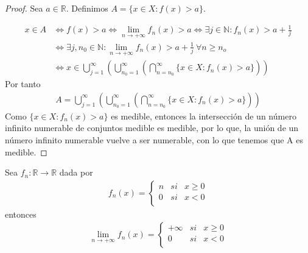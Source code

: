\begin{proof}
    Sea $a \in \mathbb{R}$. Definimos $A = \{ x \in X : f(x) > a\}$.

    \begin{align*}
        x \in A & \Longleftrightarrow f(x) > a \Longleftrightarrow \lim_{n \to +\infty}{f_n(x)} > a \Longleftrightarrow \exists j \in \mathbb{N} : f_n(x) > a + \frac{1}{j}         \\
                & \Longleftrightarrow \exists j,n_0 \in \mathbb{N} : \lim_{n \to +\infty}{f_n(x)} > a + \frac{1}{j} \ \forall  n \ge n_o                                            \\
                & \Longleftrightarrow x \in \bigcup_{j=1}^{\infty}{\left( \bigcup_{n_0 = 1}^{\infty}{\left( \bigcap_{n = n_0}^{\infty}{\{ x \in X : f_n(x) > a \}}\right)} \right)}
    \end{align*}
    Por tanto
    \begin{align*}
        A = \bigcup_{j=1}^{\infty}{\left( \bigcup_{n_0 = 1}^{\infty}{\left( \bigcap_{n = n_0}^{\infty}{\{ x \in X : f_n(x) > a \}}\right)} \right)}
    \end{align*}
    Como $\{ x \in X : f_n(x) > a \}$ es medible, entonces la intersección de un número infinito numerable de conjuntos medible es medible, por lo que, la unión de un número infinito numerable vuelve a ser numerable, con lo que tenemos que A es medible.
\end{proof}
\begin{ejemplo}
    Sea $f_n: \mathbb{R} \longrightarrow \mathbb{R}$ dada por
    \begin{align*}
        f_n(x) =  \left\{ \begin{array}{lcc}
                              n & si & x \ge 0 \\
                              0 & si & x <0    \\
                          \end{array}
        \right.
    \end{align*}
    entonces
    \begin{align*}
        \lim_{n \to +\infty}{f_n(x)} =  \left\{ \begin{array}{lcc}
                                                    +\infty & si & x \ge 0 \\
                                                    0       & si & x <0    \\
                                                \end{array}
        \right.
    \end{align*}
\end{ejemplo}

